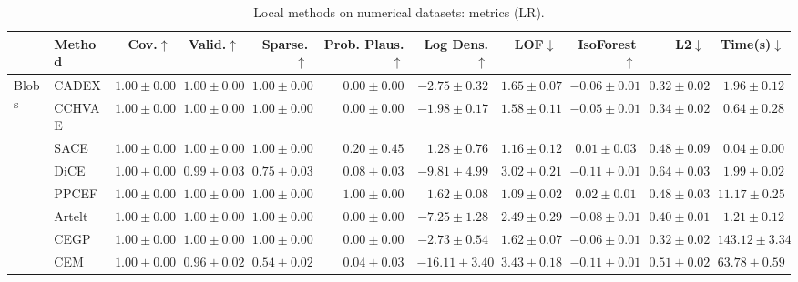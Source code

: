 \begin{table}[ht]
\centering
\caption{Local methods on numerical datasets: metrics (LR).}
\label{tab:num_metrics_lr}
\begin{center}
\begin{sc}
\begin{scriptsize}
\begin{tabular}{l|l|rrrrrrrrr}
\toprule
 & Method & Cov.$\uparrow$ & Valid.$\uparrow$ & Sparse.$\uparrow$ & Prob. Plaus.$\uparrow$ & Log Dens.$\uparrow$ & LOF$\downarrow$ & IsoForest$\uparrow$ & L2$\downarrow$ & Time(s)$\downarrow$ \\
\midrule
\multirow{9}{*}{Blobs} & CADEX & $\boldsymbol{1.00\pm{0.00}}$ & $\boldsymbol{1.00\pm{0.00}}$ & $\boldsymbol{1.00\pm{0.00}}$ & $0.00\pm{0.00}$ & $-2.75\pm{0.32}$ & $1.65\pm{0.07}$ & $-0.06\pm{0.01}$ & $\boldsymbol{0.32\pm{0.02}}$ & $1.96\pm{0.12}$ \\
 & CCHVAE & $\boldsymbol{1.00\pm{0.00}}$ & $\boldsymbol{1.00\pm{0.00}}$ & $\boldsymbol{1.00\pm{0.00}}$ & $0.00\pm{0.00}$ & $-1.98\pm{0.17}$ & $1.58\pm{0.11}$ & $-0.05\pm{0.01}$ & $0.34\pm{0.02}$ & $0.64\pm{0.28}$ \\
 & SACE & $\boldsymbol{1.00\pm{0.00}}$ & $\boldsymbol{1.00\pm{0.00}}$ & $\boldsymbol{1.00\pm{0.00}}$ & $0.20\pm{0.45}$ & $1.28\pm{0.76}$ & $1.16\pm{0.12}$ & $0.01\pm{0.03}$ & $0.48\pm{0.09}$ & $\boldsymbol{0.04\pm{0.00}}$ \\
 & DiCE & $\boldsymbol{1.00\pm{0.00}}$ & $0.99\pm{0.03}$ & $0.75\pm{0.03}$ & $0.08\pm{0.03}$ & $-9.81\pm{4.99}$ & $3.02\pm{0.21}$ & $-0.11\pm{0.01}$ & $0.64\pm{0.03}$ & $1.99\pm{0.02}$ \\
 & PPCEF & $\boldsymbol{1.00\pm{0.00}}$ & $\boldsymbol{1.00\pm{0.00}}$ & $\boldsymbol{1.00\pm{0.00}}$ & $\boldsymbol{1.00\pm{0.00}}$ & $\boldsymbol{1.62\pm{0.08}}$ & $\boldsymbol{1.09\pm{0.02}}$ & $\boldsymbol{0.02\pm{0.01}}$ & $0.48\pm{0.03}$ & $11.17\pm{0.25}$ \\
 & Artelt & $\boldsymbol{1.00\pm{0.00}}$ & $\boldsymbol{1.00\pm{0.00}}$ & $\boldsymbol{1.00\pm{0.00}}$ & $0.00\pm{0.00}$ & $-7.25\pm{1.28}$ & $2.49\pm{0.29}$ & $-0.08\pm{0.01}$ & $0.40\pm{0.01}$ & $1.21\pm{0.12}$ \\
 & CEGP & $\boldsymbol{1.00\pm{0.00}}$ & $\boldsymbol{1.00\pm{0.00}}$ & $\boldsymbol{1.00\pm{0.00}}$ & $0.00\pm{0.00}$ & $-2.73\pm{0.54}$ & $1.62\pm{0.07}$ & $-0.06\pm{0.01}$ & $\boldsymbol{0.32\pm{0.02}}$ & $143.12\pm{3.34}$ \\
 & CEM & $\boldsymbol{1.00\pm{0.00}}$ & $0.96\pm{0.02}$ & $0.54\pm{0.02}$ & $0.04\pm{0.03}$ & $-16.11\pm{3.40}$ & $3.43\pm{0.18}$ & $-0.11\pm{0.01}$ & $0.51\pm{0.02}$ & $63.78\pm{0.59}$ \\

\end{tabular}
\end{scriptsize}
\end{sc}
\end{center}
\end{table}
